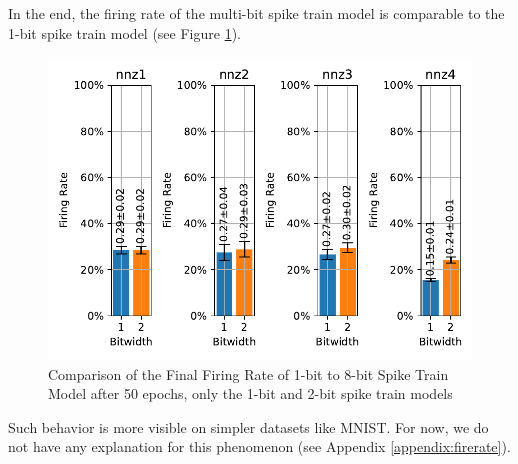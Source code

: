     In the end, the firing rate of the multi-bit spike train model is comparable to the 1-bit spike train model (see Figure \ref{fig:final_firing_rate}).
    \begin{figure}[!htpb]
        \centering
        \includegraphics[width=\textwidth]{../firerate/FashionMNIST/plots/fashionmnist_final_firerate.pdf}
        \caption{Comparison of the Final Firing Rate of 1-bit to 8-bit Spike Train Model after 50 epochs, only the 1-bit and 2-bit spike train models}
        \label{fig:final_firing_rate}
    \end{figure}

    Such behavior is more visible on simpler datasets like MNIST. For now, we do not have any explanation for this phenomenon (see Appendix \ref{appendix:firerate}).

